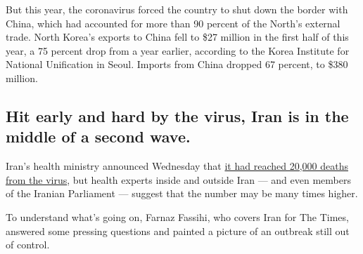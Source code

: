 But this year, the coronavirus forced the country to shut down the
border with China, which had accounted for more than 90 percent of the
North's external trade. North Korea's exports to China fell to \$27
million in the first half of this year, a 75 percent drop from a year
earlier, according to the Korea Institute for National Unification in
Seoul. Imports from China dropped 67 percent, to \$380 million.

\hypertarget{hit-early-and-hard-by-the-virus-iran-is-in-the-middle-of-a-second-wave}{%
\subsection{Hit early and hard by the virus, Iran is in the middle of a
second
wave.}\label{hit-early-and-hard-by-the-virus-iran-is-in-the-middle-of-a-second-wave}}

Iran's health ministry announced Wednesday that
\href{https://www.nytimes3xbfgragh.onion/aponline/2020/08/19/world/middleeast/ap-ml-virus-outbreak-mideast.html}{it
had reached 20,000 deaths from the virus}, but health experts inside and
outside Iran --- and even members of the Iranian Parliament --- suggest
that the number may be many times higher.

To understand what's going on, Farnaz Fassihi, who covers Iran for The
Times, answered some pressing questions and painted a picture of an
outbreak still out of control.

